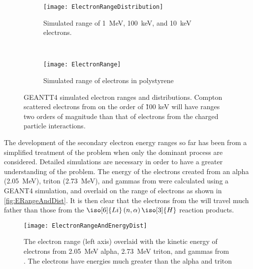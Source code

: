 \begin{figure}
  \centering
    \begin{subfigure}[b]{0.45\textwidth}
      \texttt{[image: ElectronRangeDistribution]}
      \caption{Simulated range of \SI{1}{\MeV}, \SI{100}{\keV}, and \SI{10}{\keV} electrons.}
    \end{subfigure}%
    ~
    \begin{subfigure}[b]{0.45\textwidth}
      \texttt{[image: ElectronRange]}
      \caption{Simulated range of electrons in polystyrene}
    \end{subfigure}
  \caption[Simulated Electron Ranges in Polystyrene]{GEANTT4 simulated electron ranges and distributions. Compton scattered electrons from  on the order of  \~ 100 keV will have ranges two orders of magnitude than that of electrons from the charged particle interactions.}
  \label{fig:ElectronRanges}
\end{figure}

The development of the secondary electron energy ranges so far has been from a simplified treatment of the problem when only the dominant process are considered.
Detailed simulations are necessary in order to have a greater understanding of the problem. 
The energy of the electrons created from an alpha (\SI{2.05}{\MeV}), triton (\SI{2.73}{\MeV}), and gammas from  were calculated using a GEANT4 simulation, and overlaid on the range of electrons as shown in \autoref{fig:ERangeAndDist}.
It is then clear that the electrons from the  will travel much father than those from the $\iso[6]{Li}\left(n,\alpha\right)\iso[3]{H}$ reaction products.
\begin{figure}
  \centering
  \texttt{[image: ElectronRangeAndEnergyDist]}
  \caption[Electron Range and Energy Distribution of Selected Reactions]{The electron range (left axis) overlaid with the kinetic energy of electrons from \SI{2.05}{\MeV} alpha, \SI{2.73}{\MeV} triton, and gammas from . The  electrons have energies much greater than the alpha and triton}
  \label{fig:ERangeAndDist}
\end{figure}
